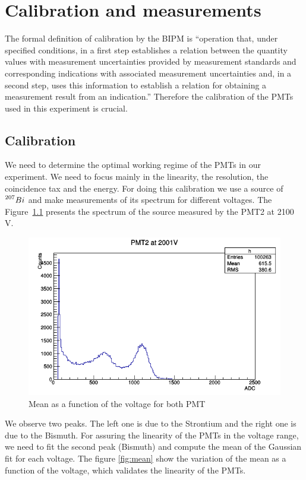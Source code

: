 \documentclass[10pt,swedish, openany]{book}
\begin{document}
\chapter{Calibration and measurements}
\label{sec:Calibration}

The formal definition of calibration by the BIPM is ``operation that, under specified conditions, in a first step establishes a relation between the quantity values with measurement uncertainties provided by measurement standards and corresponding indications with associated measurement uncertainties and, in a second step, uses this information to establish a relation for obtaining a measurement result from an indication.'' Therefore the calibration of the PMTs used in this experiment is crucial.

\section{Calibration}

We need to determine the optimal working regime of the PMTs in our experiment. We need to focus mainly in the linearity, the resolution, the coincidence tax and the energy. For doing this calibration we use a source of $\prescript{207}{}{Bi}$ and make measurements of its spectrum for different voltages. The Figure~\ref{fig:spectrum} presents the spectrum of the source measured by the PMT2 at 2100 V.

\begin{figure}[H]
\includegraphics[scale=0.7]{spectrum.png}
\centering
\caption{Mean as a function of the voltage for both PMT}
\label{fig:spectrum}
\end{figure}

We observe two peaks. The left one is due to the Strontium and the right one is due to the Bismuth. For assuring the linearity of the PMTs in the voltage range, we need to fit the second peak (Bismuth) and compute the mean of the Gaussian fit for each voltage. The figure \ref{fig:mean} show the variation of the mean as a function of the voltage, which validates the linearity of the PMTs.
\end{document}
